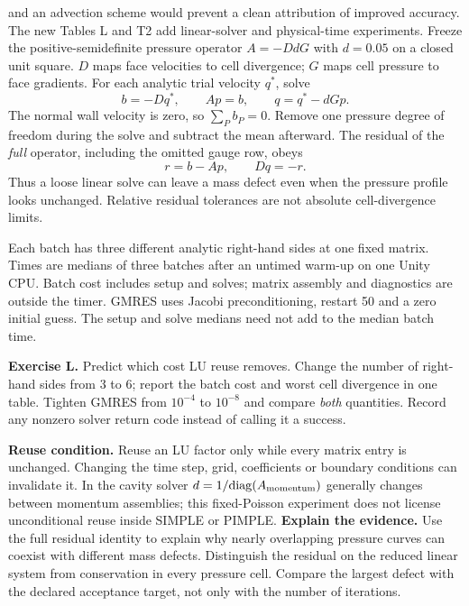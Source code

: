 and an advection scheme would prevent a clean attribution of improved accuracy.
The new Tables L and T2 add linear-solver and physical-time experiments.
\newpage
{}
Freeze the positive-semidefinite pressure operator $A=-D d G$ with $d=0.05$ on a closed
unit square. $D$ maps face velocities to cell divergence; $G$ maps cell pressure
to face gradients. For each analytic trial velocity $q^*$, solve
\[
 b=-Dq^*,\qquad Ap=b,\qquad q=q^*-dGp.
\]
The normal wall velocity is zero, so $\sum_P b_P=0$. Remove one pressure degree
of freedom during the solve and subtract the mean afterward. The residual
of the \emph{full} operator, including the omitted gauge row, obeys
\[
 r=b-Ap,\qquad Dq=-r.
\]
Thus a loose linear solve can leave a mass defect even when the pressure
profile looks unchanged. Relative residual tolerances are not absolute
cell-divergence limits.

Each batch has three different analytic right-hand sides at one fixed matrix.
Times are medians of three batches after an untimed warm-up on one Unity CPU.
Batch cost includes setup and solves; matrix assembly and diagnostics are outside
the timer. GMRES uses Jacobi preconditioning, restart 50 and a zero initial guess.
The setup and solve medians need not add to the median batch time.

\textbf{Exercise L.} Predict which cost LU reuse removes. Change the number of
right-hand sides from 3 to 6; report the batch cost and worst cell divergence
in one table. Tighten GMRES from $10^{-4}$ to $10^{-8}$ and compare \emph{both}
quantities. Record any nonzero solver return code instead of calling it a success.

\textbf{Reuse condition.} Reuse an LU factor only while every matrix entry is
unchanged. Changing the time step, grid, coefficients or boundary conditions
can invalidate it. In the cavity solver $d=1/\mathrm{diag}(A_{\rm momentum})$
generally changes between momentum assemblies; this fixed-Poisson experiment
does not license unconditional reuse inside SIMPLE or PIMPLE.
\newpage
{}
\textbf{Explain the evidence.} Use the full residual identity to explain why
nearly overlapping pressure curves can coexist with different mass defects.
Distinguish the residual on the reduced linear system from conservation in
every pressure cell. Compare the largest defect with the declared acceptance
target, not only with the number of iterations.

